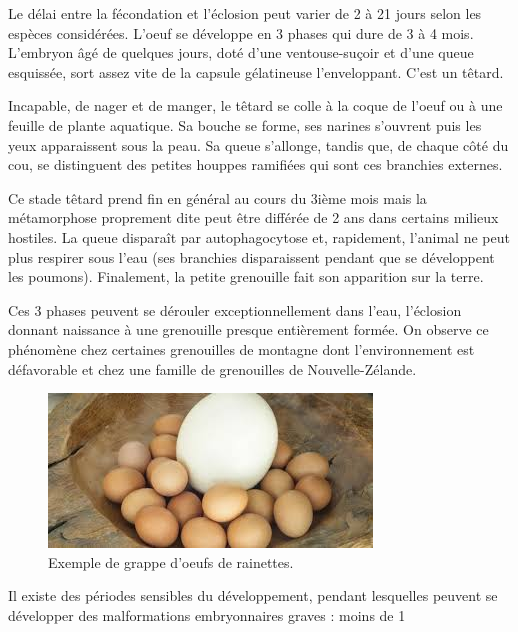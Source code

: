         Le délai entre la fécondation et l’éclosion peut varier de 2 à 21 jours selon les espèces considérées. L’oeuf se développe en 3 phases qui dure de 3 à 4 mois. L’embryon âgé de quelques jours, doté d’une ventouse-suçoir et d’une queue esquissée, sort assez vite de la capsule gélatineuse l’enveloppant. C’est un têtard.

        Incapable, de nager et de manger, le têtard se colle à la coque de l’oeuf ou à une feuille de plante aquatique. Sa bouche se forme, ses narines s’ouvrent puis les yeux apparaissent sous la peau. Sa queue s’allonge, tandis que, de chaque côté du cou, se distinguent des petites houppes ramifiées qui sont ces branchies externes.

        Ce stade têtard prend fin en général au cours du 3ième mois mais la métamorphose proprement dite peut être différée de 2 ans dans certains milieux hostiles. La queue disparaît par autophagocytose et, rapidement, l’animal ne peut plus respirer sous l’eau (ses branchies disparaissent pendant que se développent les poumons). Finalement, la petite grenouille fait son apparition sur la terre.

        Ces 3 phases peuvent se dérouler exceptionnellement dans l’eau, l’éclosion donnant naissance à une grenouille presque entièrement formée. On observe ce phénomène chez certaines grenouilles de montagne dont l’environnement est défavorable et chez une famille de grenouilles de Nouvelle-Zélande.
        	
\begin{figure}%
	\begin{center}
	\includegraphics[width=.9\textwidth]{laRepro/oeuf.jpg}	
	\end{center}
	\caption{Exemple de grappe d'oeufs de rainettes.}%
	\label{fig:autruche}%
\end{figure}

        Il existe des périodes sensibles du développement, pendant lesquelles peuvent se développer des malformations embryonnaires graves : moins de 1 %